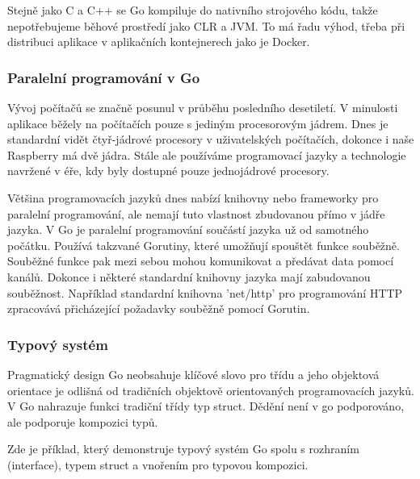 \documentclass[12pt,a4paper]{article}
\begin{document}
Stejně jako C a C++ se Go kompiluje do nativního strojového kódu, takže nepotřebujeme běhové prostředí jako CLR a JVM. To má řadu výhod, třeba při distribuci aplikace v aplikačních kontejnerech jako je Docker.

\subsubsection{Paralelní programování v Go}

Vývoj počítačů se značně posunul v průběhu posledního desetiletí. V minulosti aplikace běžely na počítačích pouze s jediným procesorovým jádrem. Dnes je standardní vidět čtyř-jádrové procesory v uživatelských počítačích, dokonce i naše Raspberry má dvě jádra. Stále ale používáme programovací jazyky a technologie navržené v éře, kdy byly dostupné pouze jednojádrové procesory.

Většina programovacích jazyků dnes nabízí knihovny nebo frameworky pro paralelní programování, ale nemají tuto vlastnost zbudovanou přímo v jádře jazyka. V Go je paralelní programování součástí jazyka už od samotného počátku. Používá takzvané Gorutiny, které umožňují spouštět funkce souběžně. Souběžné funkce pak mezi sebou mohou komunikovat a předávat data pomocí kanálů. Dokonce i některé standardní knihovny jazyka mají zabudovanou souběžnost. Například standardní knihovna 'net/http' pro programování HTTP zpracovává přicházející požadavky souběžně pomocí Gorutin.

\subsubsection{Typový systém}

Pragmatický design Go neobsahuje klíčové slovo pro třídu a jeho objektová orientace je odlišná od tradičních objektově orientovaných programovacích jazyků. V Go nahrazuje funkci tradiční třídy typ struct. Dědění není v go podporováno, ale podporuje kompozici typů.

Zde je příklad, který demonstruje typový systém Go spolu s rozhraním (interface), typem struct a vnořením pro typovou kompozici.
\end{document}

